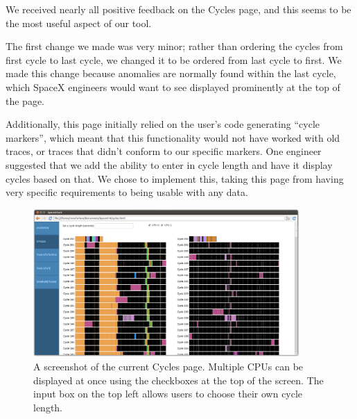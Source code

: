 \documentclass{hmcclinic}
\begin{document}
We received nearly all positive feedback on the Cycles page, and this seems to
be the most useful aspect of our tool.

The first change  we made was very minor; rather than ordering the cycles from first cycle to last cycle, we changed it to be ordered from last cycle to first. We made this change because anomalies are normally found within the last cycle, which SpaceX engineers would want to see displayed prominently at the top of the page.

Additionally, this page initially relied on the user's code generating ``cycle
markers'', which meant that this functionality would not have worked with old
traces, or traces that didn't conform to our specific markers. One engineer
suggested that we add the ability to enter in cycle length and have it display
cycles based on that. We chose to implement this, taking this page from having
very specific requirements to being usable with any data.

\begin{figure}[H]
\begin{center}
\includegraphics[width=4in]{cycles-page.png}
\caption{A screenshot of the current Cycles page. Multiple CPUs can be displayed
at once using the checkboxes at the top of the screen. The input box on the top
left allows users to choose their own cycle length.}
\end{center}
\end{figure}
\end{document}
